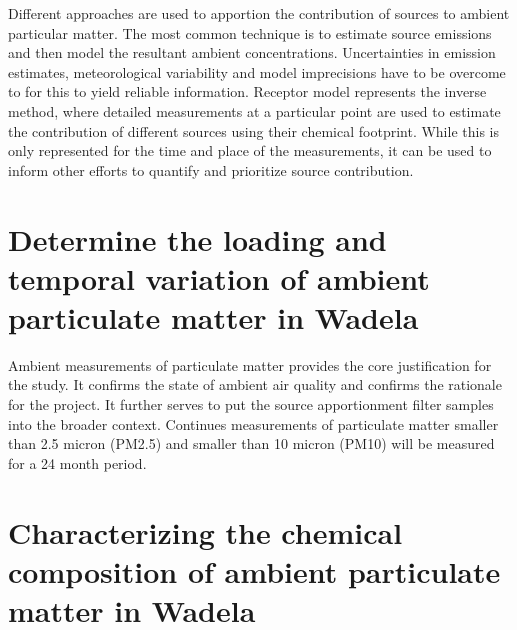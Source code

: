 \documentclass{nwureport}
\begin{document}
Different approaches are used to apportion the contribution of sources to ambient particular matter. The most
common technique is to estimate source emissions and then model the resultant ambient concentrations.
Uncertainties in emission estimates, meteorological variability and model imprecisions have to be overcome
to for this to yield reliable information. Receptor model represents the inverse method, where detailed
measurements at a particular point are used to estimate the contribution of different sources using their
chemical footprint. While this is only represented for the time and place of the measurements, it can be used
to inform other efforts to quantify and prioritize source contribution.

\section{Determine the loading and temporal variation of ambient particulate matter in Wadela}

Ambient measurements of particulate matter provides the core justification for the study. It confirms the state
of ambient air quality and confirms the rationale for the project. It further serves to put the source
apportionment filter samples into the broader context. Continues measurements of particulate matter smaller
than 2.5 micron (PM2.5) and smaller than 10 micron (PM10) will be measured for a 24 month period.

\section{Characterizing the chemical composition of ambient particulate matter in Wadela}
\end{document}
